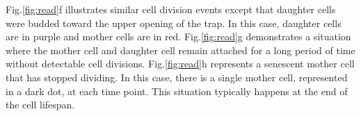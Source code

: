 \documentclass[conference]{IEEEtran}
\begin{document}
Fig.\ref{fig:read}f illustrates similar cell division events except that daughter cells were budded toward the upper opening of the trap. In this case, daughter cells are in purple and mother cells are in red. 
Fig.\ref{fig:read}g demonstrates a situation where the mother cell and daughter cell remain attached for a long period of time without detectable cell divisions. 
Fig.\ref{fig:read}h represents a senescent mother cell that has stopped dividing. In this case, there is a single mother cell, represented in a dark dot, at each time point. 
This situation typically happens at the end of the cell lifespan.
\end{document}
